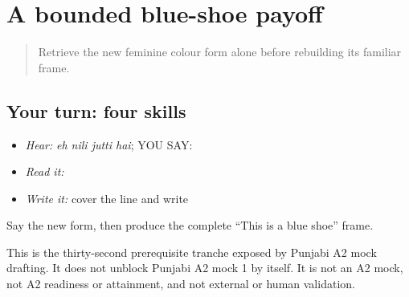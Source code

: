 \section[\texorpdfstring{\pa{ਇਹ} \pa{ਨੀਲੀ} \pa{ਜੁੱਤੀ} \pa{ਹੈ} (eh nili jutti hai)}{ਇਹ ਨੀਲੀ ਜੁੱਤੀ ਹੈ (eh nili jutti hai)}]{A bounded blue-shoe payoff}

\label{lesson:PA-C209-payoff}



\begin{quote}
Retrieve the new feminine colour form alone before rebuilding its familiar frame.
\end{quote}

\subsection*{Your turn: four skills}
\begin{itemize}
\raggedright
  \item \emph{Hear:} \emph{eh nili jutti hai}; YOU SAY: \textbf{   }
  \item \emph{Read it:} \textbf{   }
  \item \emph{Write it:} cover the line and write \textbf{   }
\end{itemize}

\begin{tcolorbox}[breakable,colback=teal!4,colframe=teal!35!black,title={Before you move on}]
Say the new form, then produce the complete “This is a blue shoe” frame.

This is the thirty-second prerequisite tranche exposed by Punjabi A2 mock drafting. It does not unblock Punjabi A2 mock 1 by itself. It is not an A2 mock, not A2 readiness or attainment, and not external or human validation.
\end{tcolorbox}
